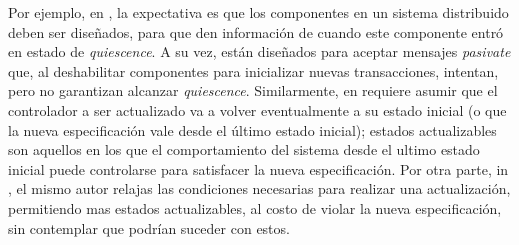 Por ejemplo, en \cite{60317}, la expectativa es que los componentes en un sistema distribuido deben ser diseñados, para que
den información de cuando este componente entró en estado de \emph{quiescence}. A su vez, están diseñados para aceptar mensajes
\emph{pasivate} que, al deshabilitar componentes para inicializar nuevas transacciones, intentan, pero no garantizan
alcanzar \emph{quiescence}. Similarmente, en \cite{6224401} requiere asumir que el controlador a ser actualizado va a volver
eventualmente a su estado inicial (o que la nueva especificación vale desde el último estado inicial); estados
actualizables son aquellos en los que el comportamiento del sistema desde el ultimo estado inicial puede controlarse
para satisfacer la nueva especificación.  Por otra parte, in \cite{PanzicaLaManna:2013:FCC:2487336.2487349}, el mismo
autor relajas las condiciones necesarias para realizar una actualización, permitiendo mas estados actualizables, al
costo de violar la nueva especificación, sin contemplar que podrían suceder con estos.




